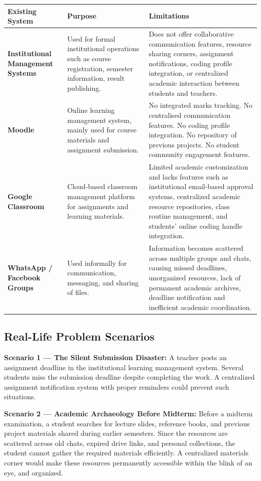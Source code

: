 \documentclass[12pt,a4paper]{article}
\newcommand{\THH}[1]{\small\bfseries\color{white} #1}
\begin{document}
\vspace{0.6em}
\begin{longtable}{|>{\bfseries\small}p{4.8cm}|p{4.8cm}|p{5.5cm}|}
\hline
\rowcolor{navyblue}
\THH{Existing System} & \THH{Purpose} & \THH{Limitations} \\
\hline
\endhead
Institutional Management Systems &
Used for formal institutional operations such as course registration, semester information, result publishing. & Does not offer collaborative communication features, resource sharing corners, assignment notifications, coding profile integration, or centralized academic interaction between students and teachers. \\
\hline
Moodle &
Online learning management system, mainly used for course materials and assignment submission. & No integrated marks tracking. No centralised communication features. No coding profile integration. No repository of previous projects. No student community engagement features. \\
\hline
Google Classroom &
Cloud-based classroom management platform for assignments and learning materials. & Limited academic customization and lacks features such as institutional email-based approval systems, centralized academic resource repositories, class routine management, and students' online coding handle integration. \\
\hline
WhatsApp / Facebook Groups &
Used informally for communication, messaging, and sharing of files. & Information becomes scattered across multiple groups and chats, causing missed deadlines, unorganized resources, lack of permanent academic archives, deadline notification and inefficient academic coordination. \\
\hline
\end{longtable}

\subsection{Real-Life Problem Scenarios}

\textbf{Scenario 1 --- The Silent Submission Disaster:} A teacher posts an assignment deadline in the institutional learning management system. Several students miss the submission deadline despite completing the work. A centralized assignment notification system with proper reminders could prevent such situations.

\medskip
\textbf{Scenario 2 --- Academic Archaeology Before Midterm:} Before a midterm examination, a student searches for lecture slides, reference books, and previous project materials shared during earlier semesters. Since the resources are scattered across old chats, expired drive links, and personal collections, the student cannot gather the required materials efficiently. A centralized materials corner would make these resources permanently accessible within the blink of an eye, and organized.
\end{document}
